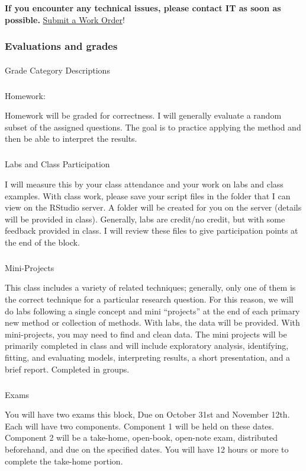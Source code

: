 \documentclass[
  letterpaper,
  DIV=11,
  numbers=noendperiod]{scrartcl}
\makeatletter
\let\oldparagraph\paragraph
\renewcommand{\paragraph}{
    \@ifstar
      \xxxParagraphStar
      \xxxParagraphNoStar
  }
\newcommand{\xxxParagraphStar}[1]{\oldparagraph*{#1}\mbox{}}
\newcommand{\xxxParagraphNoStar}[1]{\oldparagraph{#1}\mbox{}}
\let\oldsubparagraph\subparagraph
\renewcommand{\subparagraph}{
    \@ifstar
      \xxxSubParagraphStar
      \xxxSubParagraphNoStar
  }
\newcommand{\xxxSubParagraphStar}[1]{\oldsubparagraph*{#1}\mbox{}}
\newcommand{\xxxSubParagraphNoStar}[1]{\oldsubparagraph{#1}\mbox{}}
\makeatother
\begin{document}
\textbf{If you encounter any technical issues, please contact IT as soon
as possible. }
\href{https://www.cornellcollege.edu/information-technology/index.shtml}{Submit
a Work Order}!

\subsubsection{Evaluations and grades}\label{evaluations-and-grades}

\paragraph{Grade Category
Descriptions}\label{grade-category-descriptions}

\subparagraph{Homework:}\label{homework}

Homework will be graded for correctness. I will generally evaluate a
random subset of the assigned questions. The goal is to practice
applying the method and then be able to interpret the results.

\subparagraph{Labs and Class
Participation}\label{labs-and-class-participation}

I will measure this by your class attendance and your work on labs and
class examples. With class work, please save your script files in the
folder that I can view on the RStudio server. A folder will be created
for you on the server (details will be provided in class). Generally,
labs are credit/no credit, but with some feedback provided in class. I
will review these files to give participation points at the end of the
block.

\subparagraph{Mini-Projects}\label{mini-projects}

This class includes a variety of related techniques; generally, only one
of them is the correct technique for a particular research question. For
this reason, we will do labs following a single concept and mini
``projects'' at the end of each primary new method or collection of
methods. With labs, the data will be provided. With mini-projects, you
may need to find and clean data. The mini projects will be primarily
completed in class and will include exploratory analysis, identifying,
fitting, and evaluating models, interpreting results, a short
presentation, and a brief report. Completed in groups.

\subparagraph{Exams}\label{exams}

You will have two exams this block, Due on October 31st and November
12th. Each will have two components. Component 1 will be held on these
dates. Component 2 will be a take-home, open-book, open-note exam,
distributed beforehand, and due on the specified dates. You will have 12
hours or more to complete the take-home portion.
\end{document}
